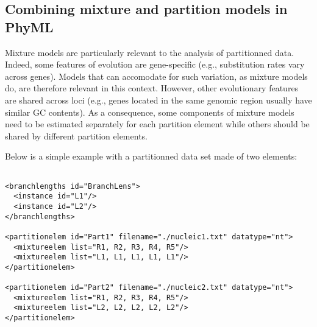 \documentclass[a4paper,12pt]{article}
\begin{document}



\subsection{Combining mixture and partition models in PhyML}

Mixture models are particularly relevant to the analysis of partitionned data. Indeed, some features
of  evolution are  gene-specific (e.g.,  substitution  rates vary  across genes).   Models that  can
accomodate  for such  variation,  as mixture  models do,  are  therefore relevant  in this  context.
However, other evolutionary features are shared across loci (e.g., genes located in the same genomic
region usually have similar  GC contents). As a consequence, some components  of mixture models need
to be  estimated separately for each  partition element while  others should be shared  by different
partition elements.

Below is a simple example with a partitionned data set made of two elements:

\vspace{0.2cm}
\begin{Verbatim}[frame=single, label=Two sets of branch lengths (one per partition element), samepage=true, baselinestretch=0.5]

<branchlengths id="BranchLens">
  <instance id="L1"/>
  <instance id="L2"/>
</branchlengths>

<partitionelem id="Part1" filename="./nucleic1.txt" datatype="nt">
  <mixtureelem list="R1, R2, R3, R4, R5"/>
  <mixtureelem list="L1, L1, L1, L1, L1"/>
</partitionelem>

<partitionelem id="Part2" filename="./nucleic2.txt" datatype="nt">
  <mixtureelem list="R1, R2, R3, R4, R5"/>
  <mixtureelem list="L2, L2, L2, L2, L2"/>
</partitionelem>

\end{Verbatim}
\end{document}
